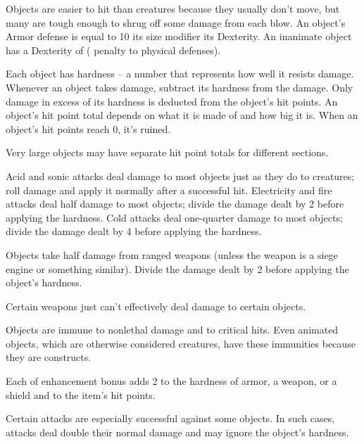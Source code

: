  Objects are easier to hit than creatures because they usually don't move, but many are tough enough to shrug off some damage from each blow. An object's Armor defense is equal to 10 \add its size modifier \add its Dexterity. An inanimate object has a Dexterity of  ( penalty to physical defenses).

 Each object has hardness -- a number that represents how well it resists damage. Whenever an object takes damage, subtract its hardness from the damage. Only damage in excess of its hardness is deducted from the object's hit points.
 An object's hit point total depends on what it is made of and how big it is. When an object's hit points reach 0, it's ruined.

Very large objects may have separate hit point totals for different sections.

 Acid and sonic attacks deal damage to most objects just as they do to creatures; roll damage and apply it normally after a successful hit. Electricity and fire attacks deal half damage to most objects; divide the damage dealt by 2 before applying the hardness. Cold attacks deal one-quarter damage to most objects; divide the damage dealt by 4 before applying the hardness.

 Objects take half damage from ranged weapons (unless the weapon is a siege engine or something similar). Divide the damage dealt by 2 before applying the object's hardness.

 Certain weapons just can't effectively deal damage to certain objects.

 Objects are immune to nonlethal damage and to critical hits. Even animated objects, which are otherwise considered creatures, have these immunities because they are constructs.

 Each  of enhancement bonus adds 2 to the hardness of armor, a weapon, or a shield and  to the item's hit points.

 Certain attacks are especially successful against some objects. In such cases, attacks deal double their normal damage and may ignore the object's hardness.

